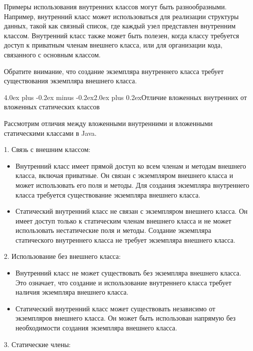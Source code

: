 \documentclass[12pt, a4paper]{book}%
\makeatletter
\renewcommand{\section}{\@startsection{section}{1}{1pt}%
{4.0ex plus -0.2ex minus -0.2ex}{2.0ex plus 0.2ex}{\centering\bf}}%
\makeatother
\begin{document}
{Примеры использования внутренних классов могут быть разнообразными. Например, внутренний класс может использоваться для реализации структуры данных, такой как связный список, где каждый узел представлен внутренним классом. Внутренний класс также может быть полезен, когда классу требуется доступ к приватным членам внешнего класса, или для организации кода, связанного с основным классом.


Обратите внимание, что создание экземпляра внутреннего класса требует существования экземпляра внешнего класса.


\section{Отличие вложенных внутренних от вложенных статических классов}

Рассмотрим отличия между вложенными внутренними и вложенными статическими классами в Java.

1. Связь с внешним классом:

\begin{itemize}
  \item Внутренний класс имеет прямой доступ ко всем членам и методам внешнего класса, включая приватные. Он связан с экземпляром внешнего класса и может использовать его поля и методы. Для создания экземпляра внутреннего класса требуется существование экземпляра внешнего класса.
   \item Статический внутренний класс не связан с экземпляром внешнего класса. Он имеет доступ только к статическим членам внешнего класса и не может использовать нестатические поля и методы. Создание экземпляра статического внутреннего класса не требует экземпляра внешнего класса.
\end{itemize}

2. Использование без внешнего класса:

\begin{itemize}
  \item Внутренний класс не может существовать без экземпляра внешнего класса. Это означает, что создание и использование внутреннего класса требует наличия экземпляра внешнего класса.
   \item Статический внутренний класс может существовать независимо от экземпляров внешнего класса. Он может быть использован напрямую без необходимости создания экземпляра внешнего класса.
\end{itemize}

3. Статические члены:

}
\end{document}
